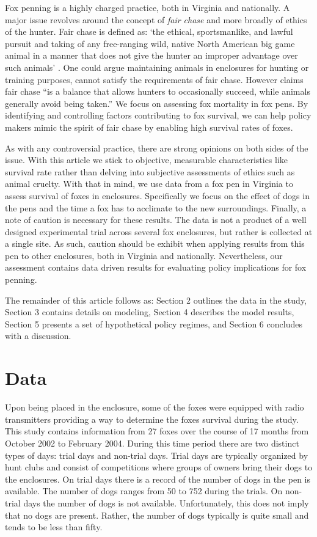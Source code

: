 \documentclass[aoas,preprint]{imsart}
\numberwithin{equation}{section}
\theoremstyle{plain}
\begin{document}
Fox penning is a highly charged practice, both in Virginia and nationally. A major issue revolves around the concept of \emph{fair chase} \citep{posewitz} and more broadly of ethics of the hunter. Fair chase is defined as: `the ethical, sportsmanlike, and lawful pursuit and taking of any free-ranging wild, native North American big game animal in a manner that does not give the hunter an improper advantage over such animals' \citep{boone}. One could argue maintaining animals in enclosures for hunting or training purposes, cannot satisfy the requirements of fair chase.  However \cite{posewitz} claims fair chase ``is a balance that allows hunters to occasionally succeed, while animals generally avoid being taken.'' We focus on assessing fox mortality in fox pens. By identifying and controlling factors contributing to fox survival, we can help policy makers mimic the spirit of fair chase by enabling high survival rates of foxes.

As with any controversial practice, there are strong opinions on both sides of the issue. With this article we stick to objective, measurable characteristics like survival rate rather than delving into subjective assessments of ethics such as animal cruelty. With that in mind, we use data from a fox pen in Virginia to assess survival of foxes in enclosures. Specifically we focus on the effect of dogs in the pens and the time a fox has to acclimate to the new surroundings. Finally, a note of caution is necessary for these results. The data is not a product of a well designed experimental trial across several fox enclosures, but rather is collected at a single site. As such, caution should be exhibit when applying results from this pen to other enclosures, both in Virginia and nationally. Nevertheless, our assessment contains data driven results for evaluating policy implications for fox penning.

The remainder of this article follows as: Section 2 outlines the data in the study, Section 3 contains details on modeling, Section 4 describes the model results, Section 5 presents a set of hypothetical policy regimes, and Section 6 concludes with a discussion.

\section{Data} Upon being placed in the enclosure, some of the foxes were equipped with radio transmitters providing a way to determine the foxes survival during the study. This study contains information from 27 foxes over the course of 17 months from October 2002 to February 2004. During this time period there are two distinct types of days: trial days and non-trial days. Trial days are typically organized by hunt clubs and consist of competitions where groups of owners bring their dogs to the enclosures. On trial days there is a record of the number of dogs in the pen is available. The number of dogs ranges from 50 to 752 during the trials. On non-trial days the number of dogs is not available. Unfortunately, this does not imply that no dogs are present. Rather, the number of dogs typically is quite small and tends to be less than fifty.
\end{document}
